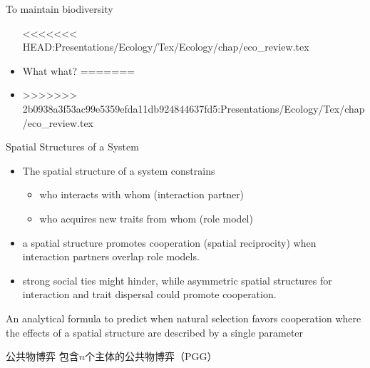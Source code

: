 \begin{frame}{To maintain biodiversity}
    \begin{itemize}
<<<<<<< HEAD:Presentations/Ecology/Tex/Ecology/chap/eco_review.tex
        \item What what?
=======
    	\item 
>>>>>>> 2b0938a3f53ac99e5359efda11db924844637fd5:Presentations/Ecology/Tex/chap/eco_review.tex
    \end{itemize}
\end{frame}

\begin{frame}{Spatial Structures of a System}
	\begin{itemize}
		\item The spatial structure of a system constrains 
		\begin{itemize}
			\item who interacts with whom (interaction partner) 
			\item who acquires new traits from whom (role model)
		\end{itemize}
		\item a spatial structure promotes cooperation (spatial reciprocity) when interaction partners overlap role models.
		\item strong social ties might hinder, while asymmetric spatial structures for interaction and trait dispersal could promote cooperation.
	\end{itemize}
 An analytical formula to predict when natural selection favors cooperation where the effects of a spatial structure are described by a single parameter
\end{frame}

\begin{frame}{公共物博弈}
	包含$n$个主体的公共物博弈（PGG）
\end{frame}